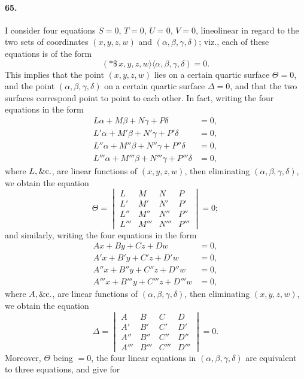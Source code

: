 \documentclass[11pt,a4paper]{article}
\providecommand{\quant}{\mathrel{\rangle\!\langle}}
\begin{document}
\paragraph{65.}
I consider four equations $S = 0$, $T = 0$, $U = 0$, $V = 0$, lineolinear in regard
to the two sets of coordinates $(x, y, z, w)$ and $(\alpha, \beta, \gamma, \delta)$;
viz., each of these equations is of the form
\[
(*\$\,x, y, z, w\quant\alpha, \beta, \gamma, \delta) = 0.
\]
This implies that the point $(x, y, z, w)$ lies on a certain quartic surface
$\Theta = 0$, and the point $(\alpha, \beta, \gamma, \delta)$ on a certain quartic
surface $\Delta = 0$, and that the two surfaces correspond point to point to each
other. In fact, writing the four equations in the form
\begin{align*}
L\alpha + M\beta + N\gamma + P\delta &= 0,\\
L'\alpha + M'\beta + N'\gamma + P'\delta &= 0,\\
L''\alpha + M''\beta + N''\gamma + P''\delta &= 0,\\
L'''\alpha + M'''\beta + N'''\gamma + P'''\delta &= 0,
\end{align*}
where $L, \&{\rm c}.$, are linear functions of $(x, y, z, w)$, then eliminating
$(\alpha, \beta, \gamma, \delta)$, we obtain the equation
\[
\Theta = \begin{vmatrix} L & M & N & P\\ L' & M' & N' & P'\\
L'' & M'' & N'' & P''\\ L''' & M''' & N''' & P''' \end{vmatrix} = 0;
\]
and similarly, writing the four equations in the form
\begin{align*}
Ax + By + Cz + Dw &= 0,\\
A'x + B'y + C'z + D'w &= 0,\\
A''x + B''y + C''z + D''w &= 0,\\
A'''x + B'''y + C'''z + D'''w &= 0,
\end{align*}
where $A, \&{\rm c}.$, are linear functions of $(\alpha, \beta, \gamma, \delta)$,
then eliminating $(x, y, z, w)$, we obtain the equation
\[
\Delta = \begin{vmatrix} A & B & C & D\\ A' & B' & C' & D'\\
A'' & B'' & C'' & D''\\ A''' & B''' & C''' & D''' \end{vmatrix} = 0.
\]
Moreover, $\Theta$ being $= 0$, the four linear equations in
$(\alpha, \beta, \gamma, \delta)$ are equivalent to three equations, and give for
\end{document}
